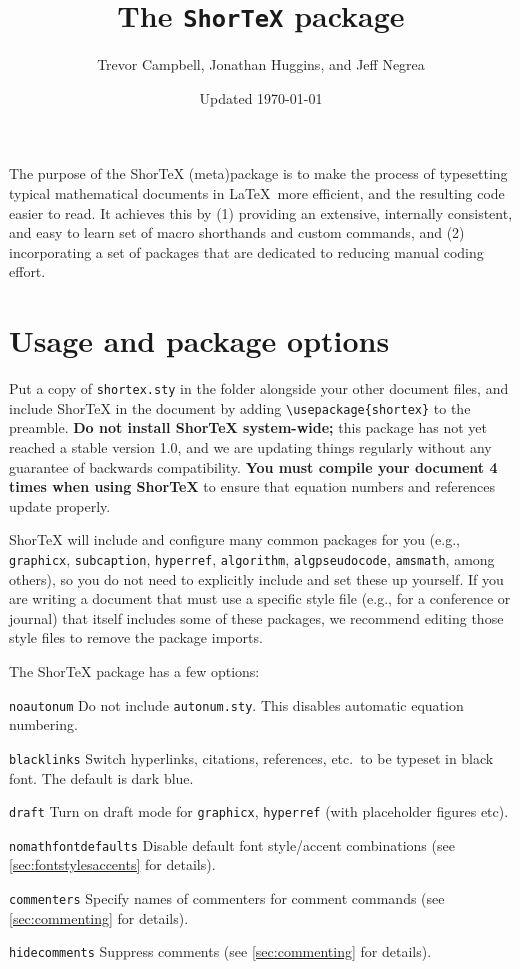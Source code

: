 \documentclass{article}
\title{The \texttt{ShorTeX} package}
\author{Trevor Campbell, Jonathan Huggins, and Jeff Negrea}
\date{Updated \today}
\begin{document}
\maketitle

\babs

The purpose of the ShorTeX (meta)package is to make the process of typesetting
typical mathematical documents in \LaTeX~more efficient, and the resulting
code easier to read.  It achieves this by 
(1) providing an
extensive, internally consistent, and easy to learn set of macro
shorthands and custom commands, and 
(2) incorporating a set of packages that are
dedicated to reducing manual coding effort.
\eabs


\tableofcontents

\section{Usage and package options}\label{sec:usage}

Put a copy of \texttt{shortex.sty} in the folder
alongside your other document files, and
include ShorTeX in the document by adding \verb!\usepackage{shortex}! to the preamble.
\textbf{Do not install ShorTeX system-wide;} this package has not yet reached a stable version 1.0,
and we are updating things regularly without any guarantee of backwards
compatibility. 
\textbf{You must compile your document 4 times when using ShorTeX} to ensure that equation
numbers and references update properly.


ShorTeX will include and configure many common packages for you (e.g., \texttt{graphicx}, \texttt{subcaption}, \texttt{hyperref},
\texttt{algorithm}, \texttt{algpseudocode}, \texttt{amsmath}, among others),
so you do not need to explicitly include and set these up yourself.
If you are writing a document that must use a specific style file (e.g., for a conference or journal) that itself
includes some of these packages, we recommend editing those style files to remove the package imports.

The ShorTeX package has a few options:
\bdesc
\item[\texttt{noautonum}] Do not include \texttt{autonum.sty}. This disables automatic equation numbering.
\item[\texttt{blacklinks}] Switch hyperlinks, citations, references, etc.~to be typeset in black font. The default is dark blue.
\item[\texttt{draft}] Turn on draft mode for \texttt{graphicx}, \texttt{hyperref} (with placeholder figures etc).
\item[\texttt{nomathfontdefaults}] Disable default font style/accent combinations (see \cref{sec:fontstylesaccents} for details).
\item[\texttt{commenters}] Specify names of commenters for comment commands (see \cref{sec:commenting} for details).
\item[\texttt{hidecomments}] Suppress comments (see \cref{sec:commenting} for details).
\edesc
\end{document}
